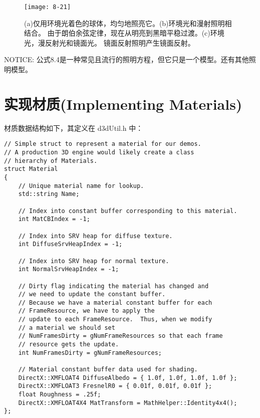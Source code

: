 \begin{figure}[h]
    \label{fig:8-21}
    \texttt{[image: 8-21]}
    \centering
    \caption{(a)仅用环境光着色的球体，均匀地照亮它。(b)环境光和漫射照明相结合。 由于朗伯余弦定律，现在从明亮到黑暗平稳过渡。(c)环境光，漫反射光和镜面光。 镜面反射照明产生镜面反射。}
\end{figure}

\begin{flushleft}
NOTICE: 公式8.4是一种常见且流行的照明方程，但它只是一个模型。还有其他照明模型。
\end{flushleft}

\section{实现材质(Implementing Materials)}
\begin{flushleft}
材质数据结构如下，其定义在 d3dUtil.h 中：\\
\end{flushleft}

\begin{lstlisting}
// Simple struct to represent a material for our demos.  
// A production 3D engine would likely create a class 
// hierarchy of Materials.
struct Material
{
    // Unique material name for lookup.
    std::string Name;

    // Index into constant buffer corresponding to this material.
    int MatCBIndex = -1;

    // Index into SRV heap for diffuse texture.
    int DiffuseSrvHeapIndex = -1;

    // Index into SRV heap for normal texture.
    int NormalSrvHeapIndex = -1;

    // Dirty flag indicating the material has changed and
    // we need to update the constant buffer.
    // Because we have a material constant buffer for each 
    // FrameResource, we have to apply the
    // update to each FrameResource.  Thus, when we modify 
    // a material we should set 
    // NumFramesDirty = gNumFrameResources so that each frame 
    // resource gets the update.
    int NumFramesDirty = gNumFrameResources;

    // Material constant buffer data used for shading.
    DirectX::XMFLOAT4 DiffuseAlbedo = { 1.0f, 1.0f, 1.0f, 1.0f };
    DirectX::XMFLOAT3 FresnelR0 = { 0.01f, 0.01f, 0.01f };
    float Roughness = .25f;
    DirectX::XMFLOAT4X4 MatTransform = MathHelper::Identity4x4();
};
\end{lstlisting}

